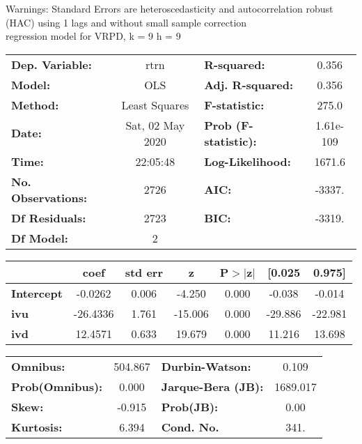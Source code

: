 Warnings: \newline
 [1] Standard Errors are heteroscedasticity and autocorrelation robust (HAC) using 1 lags and without small sample correction\\ 

regression model for VRPD, k = 9 h = 9\begin{center}
\begin{tabular}{lclc}
\toprule
\textbf{Dep. Variable:}    &       rtrn       & \textbf{  R-squared:         } &     0.356   \\
\textbf{Model:}            &       OLS        & \textbf{  Adj. R-squared:    } &     0.356   \\
\textbf{Method:}           &  Least Squares   & \textbf{  F-statistic:       } &     275.0   \\
\textbf{Date:}             & Sat, 02 May 2020 & \textbf{  Prob (F-statistic):} & 1.61e-109   \\
\textbf{Time:}             &     22:05:48     & \textbf{  Log-Likelihood:    } &    1671.6   \\
\textbf{No. Observations:} &        2726      & \textbf{  AIC:               } &    -3337.   \\
\textbf{Df Residuals:}     &        2723      & \textbf{  BIC:               } &    -3319.   \\
\textbf{Df Model:}         &           2      & \textbf{                     } &             \\
\bottomrule
\end{tabular}
\begin{tabular}{lcccccc}
                   & \textbf{coef} & \textbf{std err} & \textbf{z} & \textbf{P$> |$z$|$} & \textbf{[0.025} & \textbf{0.975]}  \\
\midrule
\textbf{Intercept} &      -0.0262  &        0.006     &    -4.250  &         0.000        &       -0.038    &       -0.014     \\
\textbf{ivu}       &     -26.4336  &        1.761     &   -15.006  &         0.000        &      -29.886    &      -22.981     \\
\textbf{ivd}       &      12.4571  &        0.633     &    19.679  &         0.000        &       11.216    &       13.698     \\
\bottomrule
\end{tabular}
\begin{tabular}{lclc}
\textbf{Omnibus:}       & 504.867 & \textbf{  Durbin-Watson:     } &    0.109  \\
\textbf{Prob(Omnibus):} &   0.000 & \textbf{  Jarque-Bera (JB):  } & 1689.017  \\
\textbf{Skew:}          &  -0.915 & \textbf{  Prob(JB):          } &     0.00  \\
\textbf{Kurtosis:}      &   6.394 & \textbf{  Cond. No.          } &     341.  \\
\bottomrule
\end{tabular}
\end{center}

